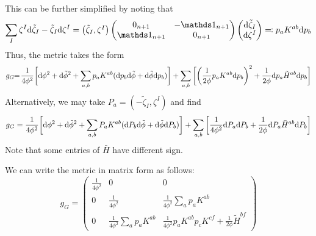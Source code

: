 This can be further simplified by noting that
\begin{equation*}
	\sum_I \zeta^I\d\tilde\zeta_I-\tilde\zeta_I \d \zeta^I=
	\begin{pmatrix}
		\tilde\zeta_I,\zeta^I
	\end{pmatrix}
	\begin{pmatrix}
		0_{n+1} & -\Unit_{n+1}\\ \Unit_{n+1} & 0_{n+1}
	\end{pmatrix}
	\begin{pmatrix}
		\d \tilde \zeta_I \\ \d \zeta^I
	\end{pmatrix}
	\eqqcolon p_a K^{ab} \d p_b
\end{equation*}
Thus, the metric takes the form
\begin{equation*}
	g_G\!\!=\!\frac{1}{4\phi^2}\bigg[\mathrm{d} \phi^2+\mathrm{d} \tilde\phi^2
	+\sum_{a,b}p_a K^{ab} (\mathrm{d} p_b \mathrm{d} \tilde\phi +\mathrm{d} \tilde \phi\mathrm{d} p_b)\bigg]
	+\sum_{a,b}\bigg[\bigg(\frac{1}{2\phi}p_a K^{ab}\mathrm{d} p_b\bigg)^2+ \frac{1}{2\phi}\mathrm{d} p_a \tilde H^{ab} \mathrm{d} p_b\bigg]
\end{equation*}
Alternatively, we may take $P_a=(-\tilde \zeta_I,\zeta^I)$ and find 
\begin{equation*}
	g_G=\frac{1}{4\phi^2}\bigg[\mathrm{d} \phi^2+\mathrm{d} \tilde\phi^2
	+\sum_{a,b}P_a K^{ab}(\mathrm{d} P_b \mathrm{d} \tilde\phi +\mathrm{d} \tilde \phi\mathrm{d} P_b)\bigg]
	+\sum_{a,b}\bigg[\frac{1}{4\phi^2}\mathrm{d} P_a\mathrm{d} P_b+ \frac{1}{2\phi}\mathrm{d} P_a \bar H^{ab} \mathrm{d} P_b\bigg]
\end{equation*}
Note that some entries of $\bar H$ have different sign. 

We can write the metric in matrix form as follows:
\begin{equation*}
	g_G=
	\begin{pmatrix}
		\frac{1}{4\phi^2} & 0 & 0 \\
		0 & \frac{1}{4\phi^2} & \frac{1}{4\phi^2}\sum_a p_a K^{ab}\\
		0 & \frac{1}{4\phi^2}\sum_a p_a K^{ab} & \frac{1}{4\phi^2} p_a K^{ab} p_c K^{cf}+\frac{1}{2\phi}\tilde H^{bf}
	\end{pmatrix}
\end{equation*}

